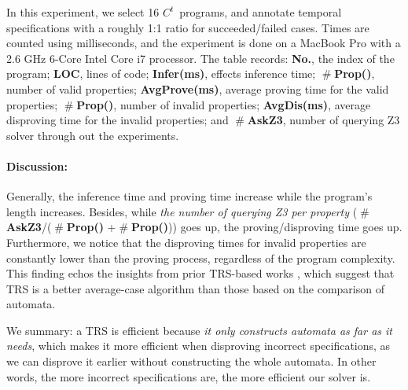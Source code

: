 \documentclass[acmsmall,10pt,review]{acmart}
\newcommand{\cmark}{\ding{51}}%
\newcommand{\xmark}{\ding{55}}%
\newcommand{\code}[1]{{\tt{\ensuremath{\m{#1}}}}}
\newcommand{\m}{\mathit}
\newcommand{\mysharp}{{\mathrel{\texttt{\#}}}}
\newcommand{\timedL}{\code{C^{t}}}
\begin{document}
{In this experiment, we select 16 \timedL\ programs, and  annotate temporal specifications
with a roughly 1:1 ratio for succeeded/failed cases. 
Times are counted using milliseconds, and the experiment is done on 
a MacBook Pro with a 2.6 GHz 6-Core Intel Core i7 processor. 
The table records: 
\textbf{No.}, the index of the program;
\textbf{LOC}, lines of code; 
\textbf{Infer(ms)}, effects inference time; 
\textbf{$\mysharp$Prop(\cmark)}, number of valid properties; 
\textbf{Avg\text{-}Prove(ms)}, average proving time for the valid properties;
\textbf{$\mysharp$Prop(\xmark)}, number of invalid properties; 
\textbf{Avg\text{-}Dis(ms)}, average disproving time for the invalid properties; and 
\textbf{$\mysharp$AskZ3}, number of querying Z3 solver through out the experiments.


\paragraph{Discussion:} Generally, the inference time and proving 
time increase while the program's length increases. 
Besides, while \emph{the number of querying Z3 per property} (\textbf{$\mysharp$AskZ3}/(\textbf{$\mysharp$Prop(\cmark)} +\textbf{$\mysharp$Prop(\xmark)})) 
goes up, the 
proving/disproving time goes up.
Furthermore, we notice that 
the disproving
times for invalid properties are constantly lower than the proving process, 
regardless of the program complexity. This finding echos the 
insights from prior TRS-based works \cite{DBLP:conf/icfem/SongC20,DBLP:journals/tcs/AntimirovM95,DBLP:journals/ijfcs/AlmeidaMR09,DBLP:conf/fsttcs/KeilT14,DBLP:journals/jcss/Hovland12}, 
which suggest that TRS is a better average-case algorithm than 
those based on the comparison of automata.  

We summary: a TRS is efficient because 
\emph{it only constructs automata as far as it needs}, which makes 
it more efficient when disproving incorrect specifications, as we can 
disprove it earlier without constructing the whole automata. In other 
words, the more incorrect specifications are, the more efficient our solver is.


}
\end{document}
